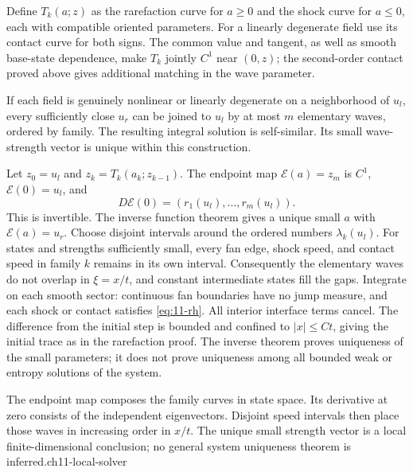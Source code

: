 Define $T_k(a;z)$ as the rarefaction curve for $a\ge0$ and the
shock curve for $a\le0$, each with compatible oriented parameters.
For a linearly degenerate field use its contact curve for both signs.
The common value and tangent, as well as smooth base-state dependence,
make $T_k$ jointly $C^1$ near $(0,z)$; the second-order contact proved
above gives additional matching in the wave parameter.
\begin{theorem}
If each field is genuinely nonlinear or linearly degenerate on a
neighborhood of $u_l$, every sufficiently close $u_r$ can be joined
to $u_l$ by at most $m$ elementary waves, ordered by family.
The resulting integral solution is self-similar. Its small wave-strength
vector is unique within this construction.
\end{theorem}
\begin{expandedproof}
Let $z_0=u_l$ and $z_k=T_k(a_k;z_{k-1})$. The endpoint map
$\mathcal E(a)=z_m$ is $C^1$, $\mathcal E(0)=u_l$, and
\[
 D\mathcal E(0)=(r_1(u_l),\ldots,r_m(u_l)).
\]
This is invertible. The inverse function theorem gives a unique small
$a$ with $\mathcal E(a)=u_r$. Choose disjoint intervals around the
ordered numbers $\lambda_k(u_l)$. For states and strengths sufficiently
small, every fan edge, shock speed, and contact speed in family $k$
remains in its own interval. Consequently the elementary waves do not
overlap in $\xi=x/t$, and constant intermediate states fill the gaps.
Integrate on each smooth sector: continuous fan boundaries have no
jump measure, and each shock or contact satisfies
\eqref{eq:11-rh}. All interior interface terms cancel. The difference
from the initial step is bounded and confined to $|x|\le Ct$, giving
the initial trace as in the rarefaction proof. The inverse theorem
proves uniqueness of the small parameters; it does not prove uniqueness
among all bounded weak or entropy solutions of the system.
\end{expandedproof}
{The endpoint map composes the family curves in state space. Its derivative
at zero consists of the independent eigenvectors. Disjoint speed intervals
then place those waves in increasing order in $x/t$. The unique small
strength vector is a local finite-dimensional conclusion; no general
system uniqueness theorem is inferred.}{ch11-local-solver}
